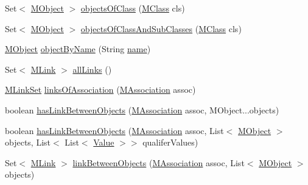 \begin{DoxyCompactItemize}
\item 
Set$<$ \hyperlink{interfaceorg_1_1tzi_1_1use_1_1uml_1_1sys_1_1_m_object}{M\-Object} $>$ \hyperlink{classorg_1_1tzi_1_1use_1_1uml_1_1sys_1_1_m_system_state_af96b0c68d310419bca993a91ccc2a8bd}{objects\-Of\-Class} (\hyperlink{interfaceorg_1_1tzi_1_1use_1_1uml_1_1mm_1_1_m_class}{M\-Class} cls)
\item 
Set$<$ \hyperlink{interfaceorg_1_1tzi_1_1use_1_1uml_1_1sys_1_1_m_object}{M\-Object} $>$ \hyperlink{classorg_1_1tzi_1_1use_1_1uml_1_1sys_1_1_m_system_state_a8e8b103d574fc13bc877fa6afd6012e9}{objects\-Of\-Class\-And\-Sub\-Classes} (\hyperlink{interfaceorg_1_1tzi_1_1use_1_1uml_1_1mm_1_1_m_class}{M\-Class} cls)
\item 
\hyperlink{interfaceorg_1_1tzi_1_1use_1_1uml_1_1sys_1_1_m_object}{M\-Object} \hyperlink{classorg_1_1tzi_1_1use_1_1uml_1_1sys_1_1_m_system_state_abace539a33e8eaa0ae1201ff2a83bdba}{object\-By\-Name} (String \hyperlink{classorg_1_1tzi_1_1use_1_1uml_1_1sys_1_1_m_system_state_a83de7299fed54e980318e06d26dc9976}{name})
\item 
Set$<$ \hyperlink{interfaceorg_1_1tzi_1_1use_1_1uml_1_1sys_1_1_m_link}{M\-Link} $>$ \hyperlink{classorg_1_1tzi_1_1use_1_1uml_1_1sys_1_1_m_system_state_a8a242f47d0429806276d6c1e000bd8bd}{all\-Links} ()
\item 
\hyperlink{classorg_1_1tzi_1_1use_1_1uml_1_1sys_1_1_m_link_set}{M\-Link\-Set} \hyperlink{classorg_1_1tzi_1_1use_1_1uml_1_1sys_1_1_m_system_state_a062c6997ef6e25b52cbd49b836b48d3c}{links\-Of\-Association} (\hyperlink{interfaceorg_1_1tzi_1_1use_1_1uml_1_1mm_1_1_m_association}{M\-Association} assoc)
\item 
boolean \hyperlink{classorg_1_1tzi_1_1use_1_1uml_1_1sys_1_1_m_system_state_ad6df679fb4764ac815061df018d13c52}{has\-Link\-Between\-Objects} (\hyperlink{interfaceorg_1_1tzi_1_1use_1_1uml_1_1mm_1_1_m_association}{M\-Association} assoc, M\-Object...\-objects)
\item 
boolean \hyperlink{classorg_1_1tzi_1_1use_1_1uml_1_1sys_1_1_m_system_state_a4c70cf84230c393e83c01f68ff01b26c}{has\-Link\-Between\-Objects} (\hyperlink{interfaceorg_1_1tzi_1_1use_1_1uml_1_1mm_1_1_m_association}{M\-Association} assoc, List$<$ \hyperlink{interfaceorg_1_1tzi_1_1use_1_1uml_1_1sys_1_1_m_object}{M\-Object} $>$ objects, List$<$ List$<$ \hyperlink{classorg_1_1tzi_1_1use_1_1uml_1_1ocl_1_1value_1_1_value}{Value} $>$$>$ qualifer\-Values)
\item 
Set$<$ \hyperlink{interfaceorg_1_1tzi_1_1use_1_1uml_1_1sys_1_1_m_link}{M\-Link} $>$ \hyperlink{classorg_1_1tzi_1_1use_1_1uml_1_1sys_1_1_m_system_state_a0ef7452731e6a7fb9a3b5787f3092718}{link\-Between\-Objects} (\hyperlink{interfaceorg_1_1tzi_1_1use_1_1uml_1_1mm_1_1_m_association}{M\-Association} assoc, List$<$ \hyperlink{interfaceorg_1_1tzi_1_1use_1_1uml_1_1sys_1_1_m_object}{M\-Object} $>$ objects)
$$
\end{DoxyCompactItemize}
